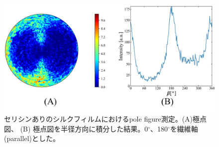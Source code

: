 \documentclass[dvipdfmx,12pt,a4paper]{jreport}
\begin{document}
			\newpage
			\begin{figure}[h]
				\centering
				\includegraphics[width=\linewidth]{セリシンあり_polefigure.jpg}
				\caption{セリシンありのシルクフィルムにおけるpole figure測定。(A)極点図、
				(B) 極点図を半径方向に積分した結果。0$^{\circ}$、180$^{\circ}$を繊維軸(parallel)とした。}
				\label{セリシン含む_pole_figure}
			\end{figure}
			\newpage
\end{document}
